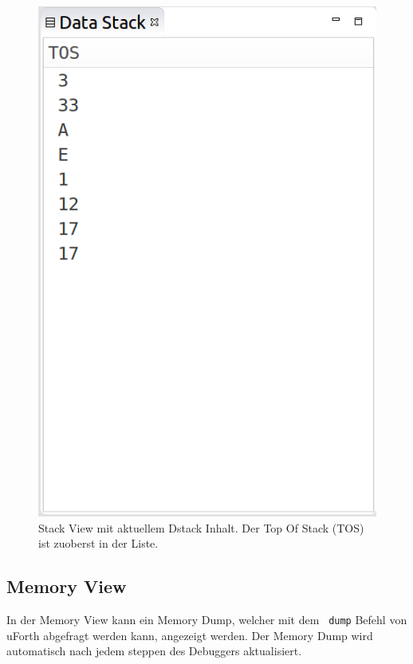 \begin{figure}[H]
	\centering
		\includegraphics[scale=0.35]{debugger/stack.png}
		\caption{Stack View mit aktuellem Dstack Inhalt. Der Top Of Stack (TOS) ist zuoberst in der Liste.}
		\label{fig:extensionpoint}
\end{figure}


\subsection{Memory View}

In der Memory View kann ein Memory Dump, welcher mit dem \verb! dump! Befehl von uForth abgefragt werden kann, angezeigt werden. Der Memory Dump wird automatisch nach jedem steppen des Debuggers aktualisiert.

